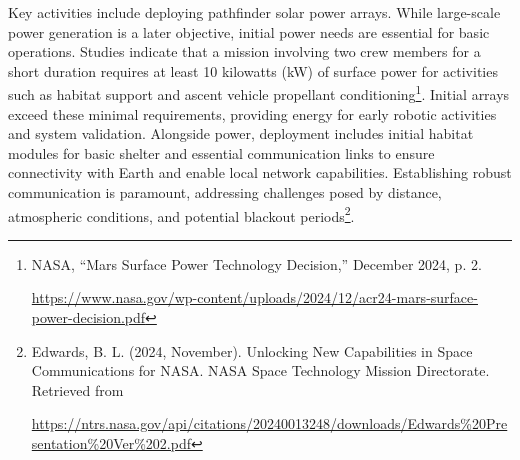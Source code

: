 \documentclass[fontsize=10pt, oneside, DIV=calc]{scrartcl}
\begin{document}
\noindent
Key activities include deploying pathfinder solar power arrays. While large-scale power generation is a later objective, initial power needs are essential for basic operations. Studies indicate that a mission involving two crew members for a short duration requires at least 10 kilowatts (kW) of surface power for activities such as habitat support and ascent vehicle propellant conditioning\footnote{NASA, ``Mars Surface Power Technology Decision,'' December 2024, p. 2. 







\href{https://www.nasa.gov/wp-content/uploads/2024/12/acr24-mars-surface-power-decision.pdf}\url{https://www.nasa.gov/wp-content/uploads/2024/12/acr24-mars-surface-power-decision.pdf}}. Initial arrays exceed these minimal requirements, providing energy for early robotic activities and system validation. Alongside power, deployment includes initial habitat modules for basic shelter and essential communication links to ensure connectivity with Earth and enable local network capabilities. Establishing robust communication is paramount, addressing challenges posed by distance, atmospheric conditions, and potential blackout periods\footnote{Edwards, B. L. (2024, November). Unlocking New Capabilities in Space Communications for NASA. NASA Space Technology Mission Directorate. Retrieved from 







\href{https://ntrs.nasa.gov/api/citations/20240013248/downloads/Edwards\%20Presentation\_Ver\%202.pdf}\url{https://ntrs.nasa.gov/api/citations/20240013248/downloads/Edwards\%20Presentation\%20Ver\%202.pdf}}.

\medskip
\end{document}
